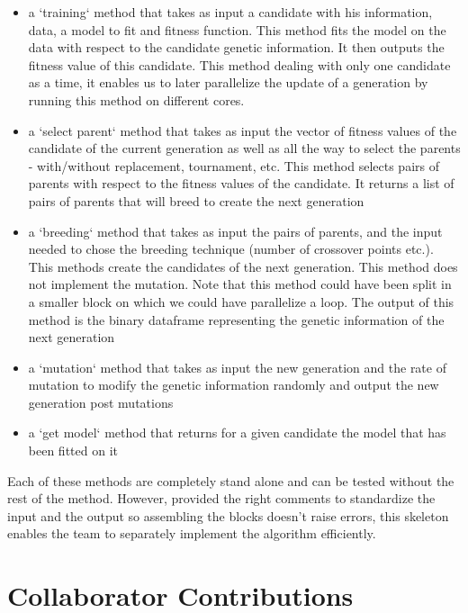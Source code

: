 \documentclass{article}\usepackage[]{graphicx}\usepackage[]{color}
\begin{document}
\begin{itemize}
  
  \item a ‘training‘ method that takes as input a candidate with his information, data, a model to fit
  and fitness function. This method fits the model on the data with respect to the candidate
  genetic information. It then outputs the fitness value of this candidate. This method dealing
  with only one candidate as a time, it enables us to later parallelize the update of a generation
  by running this method on different cores.
  
  \item a ‘select parent‘ method that takes as input the vector of fitness values of the candidate of
  the current generation as well as all the way to select the parents - with/without replacement,
  tournament, etc. This method selects pairs of parents with respect to the fitness values of the
  candidate. It returns a list of pairs of parents that will breed to create the next generation
  
  \item a ‘breeding‘ method that takes as input the pairs of parents, and the input needed to chose the
  breeding technique (number of crossover points etc.). This methods create the candidates of
  the next generation. This method does not implement the mutation. Note that this method
  could have been split in a smaller block on which we could have parallelize a loop. The
  output of this method is the binary dataframe representing the genetic information of the
  next generation
  
  \item a ‘mutation‘ method that takes as input the new generation and the rate of mutation to
  modify the genetic information randomly and output the new generation post mutations
  
  \item a ‘get model‘ method that returns for a given candidate the model that has been fitted on it

\end{itemize}

Each of these methods are completely stand alone and can be tested without the rest of the method.
However, provided the right comments to standardize the input and the output so assembling the
blocks doesn’t raise errors, this skeleton enables the team to separately implement the algorithm
efficiently.

\section{Collaborator Contributions}
\end{document}
